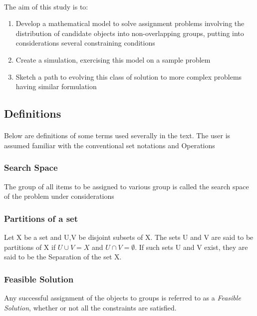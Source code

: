 \documentclass{article}
\begin{document}
            \paragraph{}
                The aim of this study is to:
                \begin{enumerate}
                    \item Develop a mathematical model to solve assignment problems involving the distribution of candidate objects into non-overlapping groups, putting into considerations several constraining conditions
                    \item Create a simulation, exercising this model on a sample problem
                    \item Sketch a path to evolving this class of solution to more complex problems having similar formulation
                \end{enumerate}
        
            \subsection{Definitions}
            \paragraph{}
            Below are definitions of some terms used severally in the text. The user is assumed familiar with the conventional set notations and Operations
            \subsubsection{Search Space}
                The group of all items to be assigned to various group is called the search space of the problem under considerations
            \subsubsection{Partitions of a set}
                Let X be a set and U,V be disjoint subsets of X. The sets U and V are said to be partitions of X if $U \cup V = X$ and $U \cap V = \emptyset$. If such sets U and V exist, they are said to be the Separation of the set X.
            \subsubsection{Feasible Solution}
                Any successful assignment of the objects to groups is referred to as a \textit{Feasible Solution}, whether or not all the constraints are satisfied.
\end{document}
